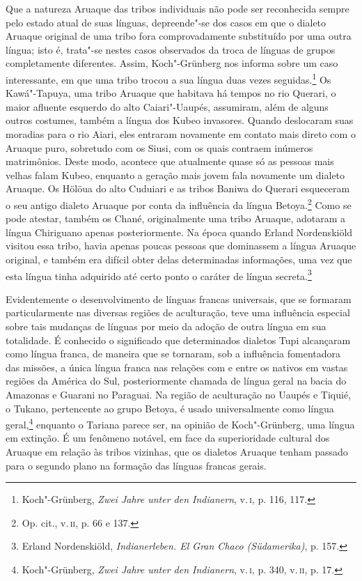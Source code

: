 Que a natureza Aruaque das tribos individuais não pode ser reconhecida
sempre pelo estado atual de suas línguas, depreende"-se dos casos em que
o dialeto Aruaque original de uma tribo fora comprovadamente substituído
por uma outra língua; isto é, trata"-se nestes casos observados da troca
de línguas de grupos completamente diferentes. Assim, Koch"-Grünberg nos
informa sobre um caso interessante, em que uma tribo trocou a sua língua
duas vezes seguidas.\footnote{Koch"-Grünberg, \emph{Zwei Jahre unter den
  Indianern}, v.\,\textsc{i}, p. 116, 117.} Os Kawá"-Tapuya, uma tribo Aruaque que
habitava há tempos no rio Querari, o maior afluente esquerdo do alto
Caiari"-Uaupés, assumiram, além de alguns outros costumes, também a
língua dos Kubeo invasores. Quando deslocaram suas moradias para o rio
Aiari, eles entraram novamente em contato mais direto com o Aruaque
puro, sobretudo com os Siusi, com os quais contraem inúmeros
matrimônios. Deste modo, acontece que atualmente quase só as pessoas
mais velhas falam Kubeo, enquanto a geração mais jovem fala novamente um
dialeto Aruaque. Os Hölöua do alto Cuduiari e as tribos Baniwa do
Querari esqueceram o seu antigo dialeto Aruaque por conta da influência
da língua Betoya.\footnote{Op. cit., v.\,\textsc{ii}, p. 66 e 137.} Como se pode
atestar, também os Chané, originalmente uma tribo Aruaque, adotaram a
língua Chiriguano apenas posteriormente. Na época quando Erland
Nordenskiöld visitou essa tribo, havia apenas poucas pessoas que
dominassem a língua Aruaque original, e também era difícil obter delas
determinadas informações, uma vez que esta língua tinha adquirido até
certo ponto o caráter de língua secreta.\footnote{Erland Nordenskiöld,
  \emph{Indianerleben. El Gran Chaco (Südamerika)}, p. 157.}

Evidentemente o desenvolvimento de línguas francas universais, que se
formaram particularmente nas diversas regiões de aculturação, teve uma
influência especial sobre tais mudanças de línguas por meio da adoção
de outra língua em sua totalidade. É conhecido o significado que
determinados dialetos Tupi alcançaram como língua franca, de maneira que
se tornaram, sob a influência fomentadora das missões, a única língua
franca nas relações com e entre os nativos em vastas regiões da América
do Sul, posteriormente chamada de língua geral na bacia do Amazonas e
Guarani no Paraguai. Na região de aculturação no Uaupés e Tiquié, o
Tukano, pertencente ao grupo Betoya, é usado universalmente como língua
geral,\footnote{Koch"-Grünberg, \emph{Zwei Jahre unter den Indianern}, v.\,\textsc{i}, p. 340, v.\,\textsc{ii}, p. 17.} enquanto o Tariana parece ser, na opinião
de Koch"-Grünberg, uma língua em extinção. É um fenômeno notável, em face
da superioridade cultural dos Aruaque em relação às tribos vizinhas, que
os dialetos Aruaque tenham passado para o segundo plano na formação
das línguas francas gerais.

